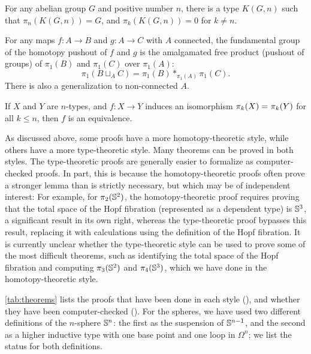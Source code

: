 \begin{thm}\label{Eilenberg-Mac-Lane-Spaces}
For any abelian group $G$ and positive number $n$, there is a type
$K(G,n)$ such that $\pi_n(K(G,n)) = G$, and  $\pi_k(K(G,n)) = 0$
for $k\neq n$.
\end{thm}

\begin{thm}\label{van-Kampen}
For any maps $f:A\to B$ and $g:A\to C$ with $A$ connected, the fundamental group of the homotopy pushout of $f$ and $g$ is the amalgamated free product (pushout of groups) of $\pi_1(B)$ and $\pi_1(C)$ over $\pi_1(A)$:
\[ \pi_1(B\sqcup_A C) = \pi_1(B) *_{\pi_1(A)} \pi_1(C).\]
There is also a generalization to non-connected $A$.
\end{thm}

\begin{thm}\label{Whitehead-for-truncated-types}
If $X$ and $Y$ are $n$-types, and $f : X \rightarrow Y$ induces an
isomorphism $\pi_k(X) =_{} \pi_k(Y)$ for all $k \le n$, then $f$ is an
equivalence.
\end{thm}

As discussed above, some proofs have a more homotopy-theoretic style,
while others have a more type-theoretic style.  Many theorems can be
proved in both styles.  The type-theoretic proofs are generally easier
to formalize as computer-checked proofs.  In part, this is because the
homotopy-theoretic proofs often prove a stronger lemma than is strictly
necessary, but which may be of independent interest: For example, for
$\pi_2(\mathbb{S} ^2)$, the homotopy-theoretic proof requires proving that the
total space of the Hopf fibration (represented as a dependent type) is
$\mathbb{S} ^3$, a significant result in its own right, whereas the
type-theoretic proof bypasses this result, replacing it with
calculations using the definition of the Hopf fibration.  It is
currently unclear whether the type-theoretic style can be used to prove
some of the most difficult theorems, such as identifying the total space of the Hopf
fibration and computing $\pi_3(\mathbb{S} ^2)$ and $\pi_4(\mathbb{S} ^3)$, which we have done in
the homotopy-theoretic style.

\autoref{tab:theorems} lists the proofs that have been done in each style (\checkmark), and
whether they have been computer-checked (\checkmark\checkmark).
For the spheres, we have used two different definitions of
the $n$-sphere $\mathbb{S} ^n$: the first as the suspension of $\mathbb{S} ^ {n-1}$,
and the second as a higher inductive type with one base point and one
loop in $\Omega^n$; we list the status for both definitions.

